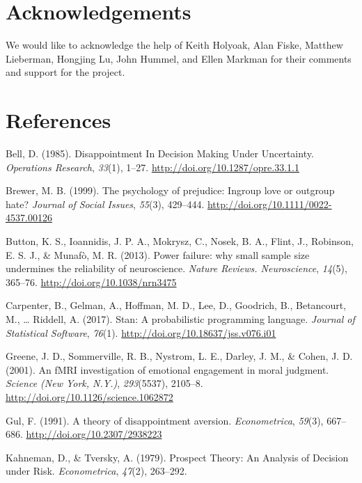 \documentclass[10pt, letterpaper]{article}
\begin{document}
\section{Acknowledgements}\label{acknowledgements}

We would like to acknowledge the help of Keith Holyoak, Alan Fiske,
Matthew Lieberman, Hongjing Lu, John Hummel, and Ellen Markman for their
comments and support for the project.

\section{References}\label{references}

\setlength{\parindent}{-0.1in} \setlength{\leftskip}{0.125in} \noindent

\hypertarget{refs}{}
\hypertarget{ref-Bell1985}{}
Bell, D. (1985). Disappointment In Decision Making Under Uncertainty.
\emph{Operations Research}, \emph{33}(1), 1--27.
\url{http://doi.org/10.1287/opre.33.1.1}

\hypertarget{ref-Brewer1999}{}
Brewer, M. B. (1999). The psychology of prejudice: Ingroup love or
outgroup hate? \emph{Journal of Social Issues}, \emph{55}(3), 429--444.
\url{http://doi.org/10.1111/0022-4537.00126}

\hypertarget{ref-Button2013}{}
Button, K. S., Ioannidis, J. P. A., Mokrysz, C., Nosek, B. A., Flint,
J., Robinson, E. S. J., \& Munafò, M. R. (2013). Power failure: why
small sample size undermines the reliability of neuroscience.
\emph{Nature Reviews. Neuroscience}, \emph{14}(5), 365--76.
\url{http://doi.org/10.1038/nrn3475}

\hypertarget{ref-Carpenter2017}{}
Carpenter, B., Gelman, A., Hoffman, M. D., Lee, D., Goodrich, B.,
Betancourt, M., \ldots{} Riddell, A. (2017). Stan: A probabilistic
programming language. \emph{Journal of Statistical Software},
\emph{76}(1). \url{http://doi.org/10.18637/jss.v076.i01}

\hypertarget{ref-Greene2001}{}
Greene, J. D., Sommerville, R. B., Nystrom, L. E., Darley, J. M., \&
Cohen, J. D. (2001). An fMRI investigation of emotional engagement in
moral judgment. \emph{Science (New York, N.Y.)}, \emph{293}(5537),
2105--8. \url{http://doi.org/10.1126/science.1062872}

\hypertarget{ref-Gul1991}{}
Gul, F. (1991). A theory of disappointment aversion.
\emph{Econometrica}, \emph{59}(3), 667--686.
\url{http://doi.org/10.2307/2938223}

\hypertarget{ref-Kahneman1979}{}
Kahneman, D., \& Tversky, A. (1979). Prospect Theory: An Analysis of
Decision under Risk. \emph{Econometrica}, \emph{47}(2), 263--292.
\end{document}
